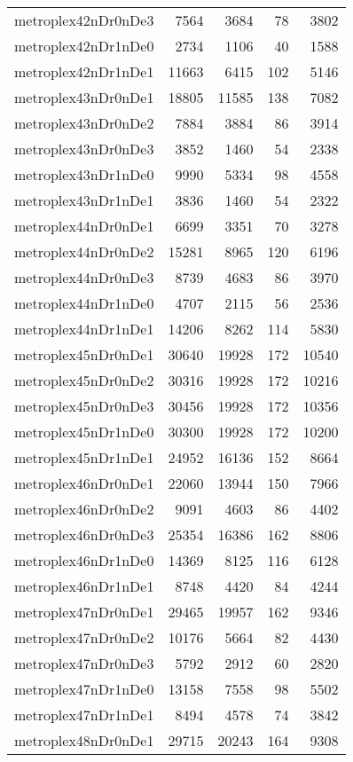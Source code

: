 \begin{longtable}{lrrrr}
metroplex42nDr0nDe3 & 7564 & 3684 & 78 & 3802 \\
metroplex42nDr1nDe0 & 2734 & 1106 & 40 & 1588 \\
metroplex42nDr1nDe1 & 11663 & 6415 & 102 & 5146 \\
metroplex43nDr0nDe1 & 18805 & 11585 & 138 & 7082 \\
metroplex43nDr0nDe2 & 7884 & 3884 & 86 & 3914 \\
metroplex43nDr0nDe3 & 3852 & 1460 & 54 & 2338 \\
metroplex43nDr1nDe0 & 9990 & 5334 & 98 & 4558 \\
metroplex43nDr1nDe1 & 3836 & 1460 & 54 & 2322 \\
metroplex44nDr0nDe1 & 6699 & 3351 & 70 & 3278 \\
metroplex44nDr0nDe2 & 15281 & 8965 & 120 & 6196 \\
metroplex44nDr0nDe3 & 8739 & 4683 & 86 & 3970 \\
metroplex44nDr1nDe0 & 4707 & 2115 & 56 & 2536 \\
metroplex44nDr1nDe1 & 14206 & 8262 & 114 & 5830 \\
metroplex45nDr0nDe1 & 30640 & 19928 & 172 & 10540 \\
metroplex45nDr0nDe2 & 30316 & 19928 & 172 & 10216 \\
metroplex45nDr0nDe3 & 30456 & 19928 & 172 & 10356 \\
metroplex45nDr1nDe0 & 30300 & 19928 & 172 & 10200 \\
metroplex45nDr1nDe1 & 24952 & 16136 & 152 & 8664 \\
metroplex46nDr0nDe1 & 22060 & 13944 & 150 & 7966 \\
metroplex46nDr0nDe2 & 9091 & 4603 & 86 & 4402 \\
metroplex46nDr0nDe3 & 25354 & 16386 & 162 & 8806 \\
metroplex46nDr1nDe0 & 14369 & 8125 & 116 & 6128 \\
metroplex46nDr1nDe1 & 8748 & 4420 & 84 & 4244 \\
metroplex47nDr0nDe1 & 29465 & 19957 & 162 & 9346 \\
metroplex47nDr0nDe2 & 10176 & 5664 & 82 & 4430 \\
metroplex47nDr0nDe3 & 5792 & 2912 & 60 & 2820 \\
metroplex47nDr1nDe0 & 13158 & 7558 & 98 & 5502 \\
metroplex47nDr1nDe1 & 8494 & 4578 & 74 & 3842 \\
metroplex48nDr0nDe1 & 29715 & 20243 & 164 & 9308 \\

\end{longtable}
